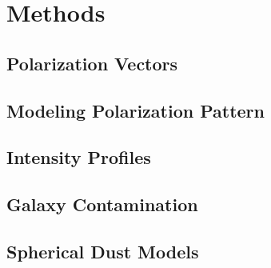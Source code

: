 \chapter{Methods}
\label{ch_methods}


\section{Polarization Vectors}



\section{Modeling Polarization Pattern}
\label{sec: methods/modelling polarization pattern}




\section{Intensity Profiles}



\section{Galaxy Contamination}



\section{Spherical Dust Models}
